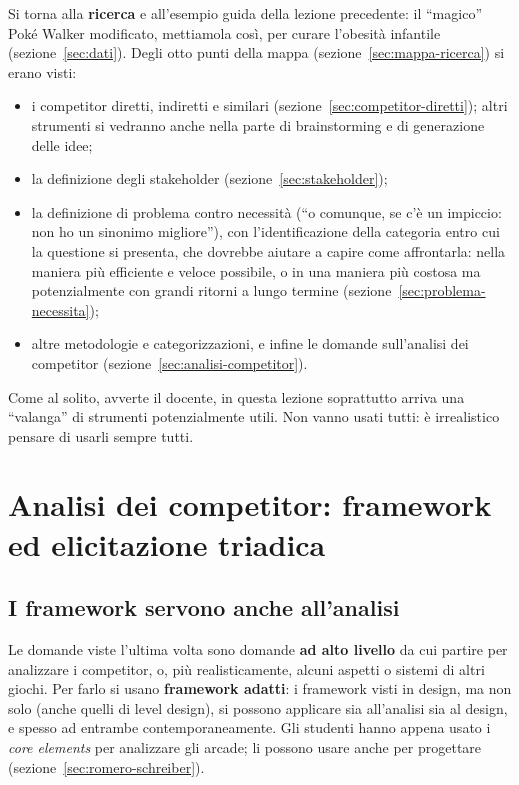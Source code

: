 Si torna alla \textbf{ricerca} e all'esempio guida della lezione precedente:
il ``magico'' Poké Walker modificato, mettiamola così, per curare l'obesità
infantile (sezione~\ref{sec:dati}). Degli otto punti della mappa
(sezione~\ref{sec:mappa-ricerca}) si erano visti:
\begin{itemize}
  \item i competitor diretti, indiretti e similari
        (sezione~\ref{sec:competitor-diretti}); altri strumenti si vedranno
        anche nella parte di brainstorming e di generazione delle idee;
  \item la definizione degli stakeholder (sezione~\ref{sec:stakeholder});
  \item la definizione di problema contro necessità (``o comunque, se c'è un
        impiccio: non ho un sinonimo migliore''), con l'identificazione della
        categoria entro cui la questione si presenta, che dovrebbe aiutare a
        capire come affrontarla: nella maniera più efficiente e veloce
        possibile, o in una maniera più costosa ma potenzialmente con grandi
        ritorni a lungo termine (sezione~\ref{sec:problema-necessita});
  \item altre metodologie e categorizzazioni, e infine le domande
        sull'analisi dei competitor (sezione~\ref{sec:analisi-competitor}).
\end{itemize}
Come al solito, avverte il docente, in questa lezione soprattutto arriva una
``valanga'' di strumenti potenzialmente utili. Non vanno usati tutti: è
irrealistico pensare di usarli sempre tutti.

\section{Analisi dei competitor: framework ed elicitazione triadica}
\label{sec:framework-triadica}

\subsection{I framework servono anche all'analisi}

Le domande viste l'ultima volta sono domande \textbf{ad alto livello} da cui
partire per analizzare i competitor, o, più realisticamente, alcuni aspetti
o sistemi di altri giochi. Per farlo si usano \textbf{framework adatti}: i
framework visti in design, ma non solo (anche quelli di level design), si
possono applicare sia all'analisi sia al design, e spesso ad entrambe
contemporaneamente. Gli studenti hanno appena usato i \emph{core elements}
per analizzare gli arcade; li possono usare anche per progettare
(sezione~\ref{sec:romero-schreiber}).

